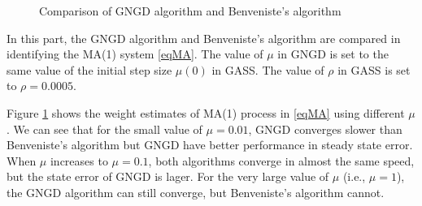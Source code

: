 \documentclass[10pt]{article}
\begin{document}
\begin{figure}[htbp]
    \centering
    \caption{Comparison of GNGD algorithm and Benveniste’s algorithm}
    \label{fig14}
\end{figure}

In this part, the GNGD algorithm and Benveniste’s algorithm are compared in identifying the MA(1) system \eqref{eqMA}. 
The value of $\mu$ in GNGD is set to the same value of the initial step size $\mu(0)$ in GASS. 
The value of $\rho$ in GASS is set to $\rho=0.0005$. 

Figure \ref{fig14} shows the weight estimates of MA(1) process in \eqref{eqMA} using different 
$\mu$. We can see that for the small value of $\mu=0.01$, GNGD converges slower than Benveniste’s algorithm but GNGD 
have better performance in steady state error. When $\mu$ increases to $\mu=0.1$, both algorithms 
converge in almost the same speed, but the state error of GNGD is lager. For the very large value of
$\mu$ (i.e., $\mu=1$), the GNGD algorithm can still converge, but Benveniste’s algorithm cannot.
\end{document}
